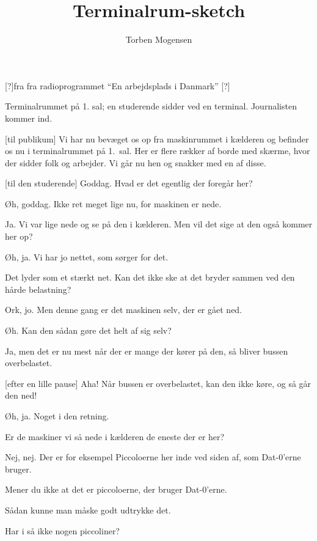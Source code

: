 \documentclass[a4paper,11pt]{article}
\title{Terminalrum-sketch}
\author{Torben Mogensen}
\begin{document}
\begin{roles}
  [?]fra fra radioprogrammet ``En arbejdsplads i Danmark''
  [?]
\end{roles}

\begin{sketch}
  \scene Terminalrummet på 1. sal; en studerende sidder ved en
  terminal.  Journalisten kommer ind.
  
  [til publikum] Vi har nu bevæget os op fra
  maskinrummet i kælderen og befinder os nu i terminalrummet på
  1.\ sal.  Her er flere rækker af borde med skærme, hvor der sidder
  folk og arbejder.  Vi går nu hen og snakker med en af disse.

  [til den studerende] Goddag.  Hvad er det
  egentlig der foregår her?

   Øh, goddag.  Ikke ret meget lige nu, for maskinen er
  nede.

   Ja.  Vi var lige nede og se på den i kælderen.
  Men vil det sige at den også kommer her op?

   Øh, ja.  Vi har jo nettet, som sørger for det.

   Det lyder som et stærkt net.  Kan det ikke ske
  at det bryder sammen ved den hårde belastning?

   Ork, jo.  Men denne gang er det maskinen selv, der
  er gået ned.

   Øh.  Kan den sådan gøre det helt af sig selv?

   Ja, men det er nu mest når der er mange der kører
  på den, så bliver bussen overbelastet.

  [efter en lille pause] Aha!  Når bussen er
  overbelastet, kan den ikke køre, og så går den ned!

   Øh, ja.  Noget i den retning.

   Er de maskiner vi så nede i kælderen de eneste
  der er her?

   Nej, nej.  Der er for eksempel Piccoloerne her inde
  ved siden af, som Dat-0'erne bruger.

   Mener du ikke at det er piccoloerne, der bruger
  Dat-0'erne.  

   Sådan kunne man måske godt udtrykke det.

   Har i så ikke nogen piccoliner?


\end{sketch}
\end{document}
